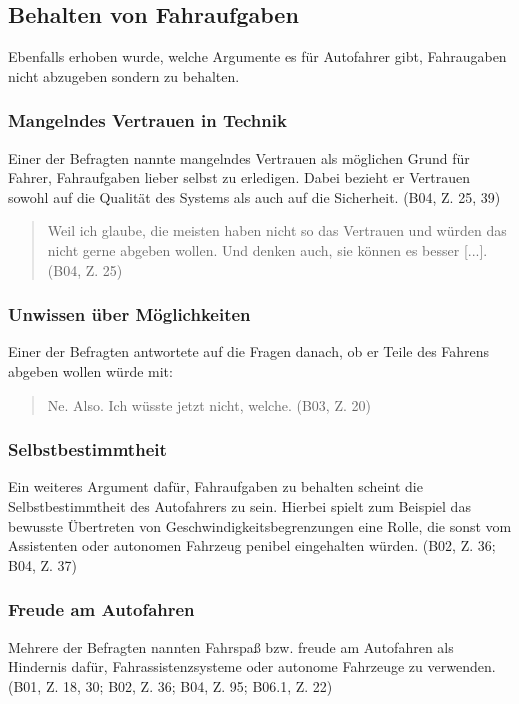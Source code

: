 \documentclass[12pt]{article}
\begin{document}
\subsection{Behalten von Fahraufgaben}
Ebenfalls erhoben wurde, welche Argumente es für Autofahrer gibt, Fahraugaben nicht abzugeben sondern zu behalten.

\subsubsection*{Mangelndes Vertrauen in Technik}
Einer der Befragten nannte mangelndes Vertrauen als möglichen Grund für Fahrer, Fahraufgaben lieber selbst zu erledigen. Dabei bezieht er Vertrauen sowohl auf die Qualität des Systems als auch auf die Sicherheit. (B04, Z. 25, 39)

\begin{quote}
  Weil ich glaube, die meisten haben nicht so das Vertrauen und würden das nicht gerne abgeben wollen. Und denken auch, sie können es besser [...]. (B04, Z. 25)
\end{quote}

\subsubsection*{Unwissen über Möglichkeiten}
Einer der Befragten antwortete auf die Fragen danach, ob er Teile des Fahrens abgeben wollen würde mit:

\begin{quote}
  Ne. Also. Ich wüsste jetzt nicht, welche. (B03, Z. 20)
\end{quote}

\subsubsection*{Selbstbestimmtheit}
Ein weiteres Argument dafür, Fahraufgaben zu behalten scheint die Selbstbestimmtheit des Autofahrers zu sein. Hierbei spielt zum Beispiel das bewusste Übertreten von Geschwindigkeitsbegrenzungen eine Rolle, die sonst vom Assistenten oder autonomen Fahrzeug penibel eingehalten würden. (B02, Z. 36; B04, Z. 37)

\subsubsection*{Freude am Autofahren}
Mehrere der Befragten nannten Fahrspaß bzw. freude am Autofahren als Hindernis dafür, Fahrassistenzsysteme oder autonome Fahrzeuge zu verwenden. (B01, Z. 18, 30; B02, Z. 36; B04, Z. 95; B06.1, Z. 22)
\end{document}
